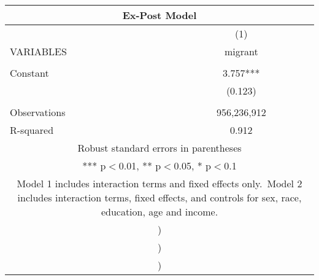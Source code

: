 \begin{tabular}{lc}
\multicolumn{2}{c}{Ex-Post Model} \\ \hline
 & (1) \\
VARIABLES & migrant \\ \hline
 &  \\
Constant & 3.757*** \\
 & (0.123) \\
 &  \\
Observations & 956,236,912 \\
 R-squared & 0.912 \\ \hline
\multicolumn{2}{c}{ Robust standard errors in parentheses} \\
\multicolumn{2}{c}{ *** p$<$0.01, ** p$<$0.05, * p$<$0.1} \\
\multicolumn{2}{c}{ Model 1 includes interaction terms and fixed effects only.\ Model 2 includes interaction terms, fixed effects, and controls for sex, race, education, age and income.} \\
\multicolumn{2}{c}{ )} \\
\multicolumn{2}{c}{ )} \\
\multicolumn{2}{c}{ )} \\
\end{tabular}
